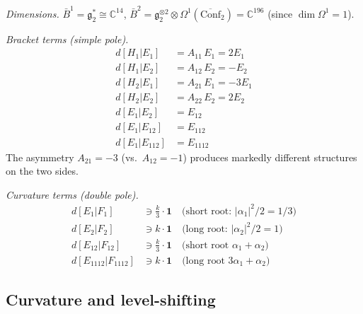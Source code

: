 \begin{computation}
\label{comp:G2-bar-deg2}

\emph{Dimensions.}
$\bar{B}^1 = \mathfrak{g}_2^* \cong \mathbb{C}^{14}$,
$\bar{B}^2 = \mathfrak{g}_2^{\otimes 2} \otimes
\Omega^1(\overline{\mathrm{Conf}}_2) = \mathbb{C}^{196}$
(since $\dim \Omega^1 = 1$).

\emph{Bracket terms (simple pole).}
\begin{align}
d[H_{1}|E_1] &= A_{11}\, E_1 = 2E_1 \\
d[H_{1}|E_2] &= A_{12}\, E_2 = -E_2 \\
d[H_{2}|E_1] &= A_{21}\, E_1 = -3E_1 \\
d[H_{2}|E_2] &= A_{22}\, E_2 = 2E_2 \\
d[E_1|E_2] &= E_{12} \\
d[E_1|E_{12}] &= E_{112} \\
d[E_1|E_{112}] &= E_{1112}
\end{align}
The asymmetry $A_{21} = -3$ (vs.\ $A_{12} = -1$) produces
markedly different structures on the two sides.

\emph{Curvature terms (double pole).}
\begin{align}
d[E_1|F_1] &\ni \frac{k}{3}\cdot\mathbf{1}
  \quad\text{(short root: $|\alpha_1|^2/2 = 1/3$)} \\
d[E_2|F_2] &\ni k\cdot\mathbf{1}
  \quad\text{(long root: $|\alpha_2|^2/2 = 1$)} \\
d[E_{12}|F_{12}] &\ni \frac{k}{3}\cdot\mathbf{1}
  \quad\text{(short root $\alpha_1+\alpha_2$)} \\
d[E_{1112}|F_{1112}] &\ni k\cdot\mathbf{1}
  \quad\text{(long root $3\alpha_1+\alpha_2$)}
\end{align}
\end{computation}

\subsection{Curvature and level-shifting}

